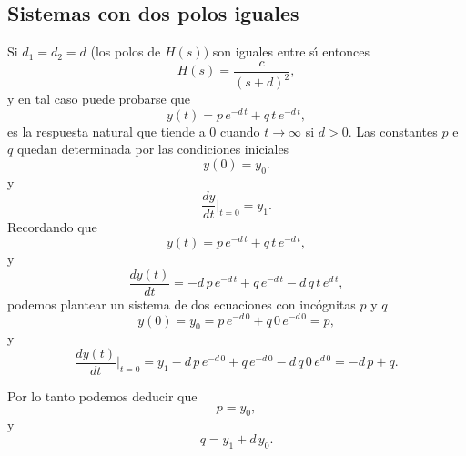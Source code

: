 \subsection{Sistemas con dos polos iguales}

Si $d_{1}=d_{2}=d$ (los polos de $H\left( s\right) )$ son iguales entre s\'{\i} entonces 
\begin{equation}
        H\left( s\right) =\frac{c}{\left( s+d\right) ^{2}},
\end{equation}
y en tal caso puede probarse que 
\begin{equation}
        y\left( t\right) = p \, e^{-d \, t} + q \, t \, e^{-d \, t},
\end{equation}
es la respuesta natural que tiende a $0$ cuando $t \rightarrow \infty$ si $d > 0$.
Las constantes $p$ e $q$ quedan determinada por las condiciones iniciales 
\begin{equation}
	y\left( 0 \right) = y_{0}.
\end{equation}
y
\begin{equation}
	\frac{dy}{dt}|_{t=0} = y_{1}.
\end{equation} 
Recordando que
\begin{equation}
	y\left( t\right) = p \, e^{-d \, t} + q \, t \, e^{-d \, t},
\end{equation}
y
\begin{equation}
	\frac{dy\left( t\right)}{dt} =
	- d \, p \, e^{-d \, t} + q \, e^{-d \, t} - d \, q \, t \, e^{d \, t},
\end{equation}
podemos plantear un sistema de dos ecuaciones con incógnitas $p$ y $q$
\begin{equation}
	y\left( 0\right) = y_{0} = p \, e^{-d \, 0} + q \, 0 \, e^{-d \, 0} = p,
\end{equation}
y
\begin{equation}
	\frac{dy\left( t\right)}{dt} |_{t=0} = y_{1}
	- d \, p \, e^{-d \, 0} + q \, e^{-d \, 0} - d \, q \, 0 \, e^{d \, 0} = 
	-d \, p + q.
\end{equation}

Por lo tanto podemos deducir que
\begin{equation}
	p = y_{0},
\end{equation}
y
\begin{equation}
	q = y_{1} + d \, y_{0}.
\end{equation}



